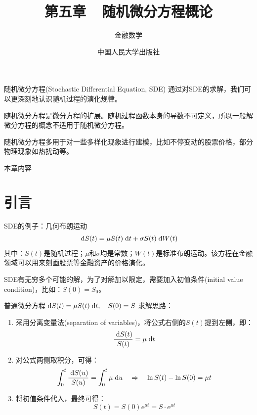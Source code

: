 \documentclass[t]{beamer}
\newcommand{\dif}{{\;\rm d}}
\begin{document}
\fontsize{11}{18}\selectfont


\CTEXindent

\title{第五章~~随机微分方程概论}
\author{金融数学}
\date{
	中国人民大学出版社}
\begin{frame}
	\maketitle
\end{frame}

\begin{frame}{随机微分方程(Stochastic Differential Equation, SDE)}
通过对SDE的求解，我们可以更深刻地认识随机过程的演化规律。

随机微分方程是微分方程的扩展。随机过程函数本身的导数不可定义，所以一般解微分方程的概念不适用于随机微分方程。

随机微分方程多用于对一些多样化现象进行建模，比如不停变动的股票价格，部分物理现象如热扰动等。
\end{frame}

\begin{frame}{本章内容}
\tableofcontents

\end{frame}


\section{引言}


\begin{frame}{SDE的例子：几何布朗运动}
\[\dif S(t)=\mu S(t)\dif t+\sigma S(t) \dif W(t)\]
其中：$S(t)$是随机过程；$\mu$和$\sigma$均是常数；$W(t)$是标准布朗运动。该方程在金融领域可以用来刻画股票等金融资产的价格演化。

SDE有无穷多个可能的解，为了对解加以限定，需要加入初值条件(initial value condition)，比如：$S(0)=S_0$。
\end{frame}

\begin{frame}{普通微分方程$\dif S(t)=\mu S(t)\dif t,\quad S(0)=S$}
求解思路：
\begin{enumerate}
\item 采用分离变量法(separation of variables)，将公式右侧的$S(t)$提到左侧，即：
\[\frac{\dif S(t)}{S(t)}=\mu \dif t \]
\item 对公式两侧取积分，可得：
\[\int^t_0\frac{\dif S(u)}{S(u)}=\int^t_0\mu \dif u \quad \Rightarrow\quad \ln S(t)-\ln S(0)=\mu t \]
\item 将初值条件代入，最终可得：
\[S(t)=S(0)e^{\mu t}= S\cdot e^{\mu t}\]
\end{enumerate}
\end{frame}
\end{document}

